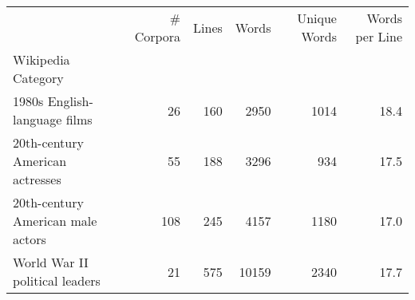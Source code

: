 \begin{tabular}{lrrrrr}
\toprule
 & \# Corpora & Lines & Words & Unique Words & Words per Line \\
Wikipedia Category &  &  &  &  &  \\
\midrule
1980s English-language films & 26 & 160 & 2950 & 1014 & 18.4 \\
20th-century American actresses & 55 & 188 & 3296 & 934 & 17.5 \\
20th-century American male actors & 108 & 245 & 4157 & 1180 & 17.0 \\
World War II political leaders & 21 & 575 & 10159 & 2340 & 17.7 \\
\bottomrule
\end{tabular}
